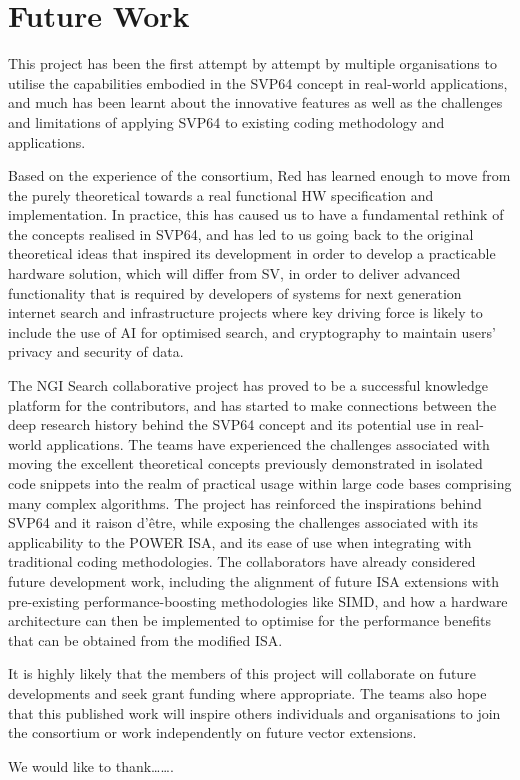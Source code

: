 \section{Future Work}

This project has been the first attempt by attempt by multiple organisations
to utilise the capabilities embodied in the SVP64 concept in real-world
applications, and much has been learnt about the innovative features as well
as the challenges and limitations of applying SVP64 to existing
coding methodology and applications.

Based on the experience of the consortium, Red has learned enough to move from
the purely theoretical towards a real functional HW specification
and implementation.
In practice, this has caused us to have a fundamental rethink of the concepts
realised in SVP64, and has led to us going back to the original theoretical
ideas that inspired its development in order to develop a practicable hardware
solution, which will differ from \acrshort{SV}, in order to deliver
advanced functionality that is required by developers of systems for next
generation internet search and infrastructure projects where key driving force
is likely to include the use of AI for optimised search, and cryptography to
maintain users' privacy and security of data.

The NGI Search collaborative project has proved to be a successful knowledge
platform for the contributors, and has started to make connections between the
deep research history behind the SVP64 concept and its potential use in
real-world applications. The teams have experienced the challenges associated
with moving the excellent theoretical concepts previously demonstrated in
isolated code snippets into the realm of practical usage within large code
bases comprising many complex algorithms. The project has reinforced the
inspirations behind SVP64 and it raison d’être, while exposing the challenges
associated with its applicability to the POWER ISA, and its ease of use when
integrating with traditional coding methodologies. The collaborators have
already considered future development work, including the alignment of future
ISA extensions with pre-existing performance-boosting methodologies like SIMD,
and how a hardware architecture can then be implemented to optimise for the
performance benefits that can be obtained from the modified ISA.

It is highly likely that the members of this project will collaborate on future
developments and seek grant funding where appropriate. The teams also hope that
this published work will inspire others individuals and organisations to join
the consortium or work independently on future vector extensions.

We would like to thank…….

